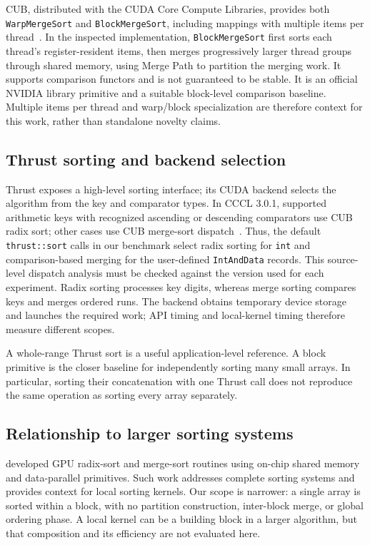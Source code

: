 \documentclass[fleqn,10pt,lineno]{wlpeerj}
\begin{document}
CUB, distributed with the CUDA Core Compute Libraries, provides both \texttt{WarpMergeSort} and \texttt{BlockMergeSort}, including mappings with multiple items per thread~\citep{nvidiaCubWarpMergeSort,nvidiaCubBlockMergeSort}. In the inspected implementation, \texttt{BlockMergeSort} first sorts each thread's register-resident items, then merges progressively larger thread groups through shared memory, using Merge Path to partition the merging work. It supports comparison functors and is not guaranteed to be stable. It is an official NVIDIA library primitive and a suitable block-level comparison baseline. Multiple items per thread and warp/block specialization are therefore context for this work, rather than standalone novelty claims.

\subsection*{Thrust sorting and backend selection}
Thrust exposes a high-level sorting interface; its CUDA backend selects the algorithm from the key and comparator types. In CCCL 3.0.1, supported arithmetic keys with recognized ascending or descending comparators use CUB radix sort; other cases use CUB merge-sort dispatch~\citep{nvidiaThrustSort}. Thus, the default \texttt{thrust::sort} calls in our benchmark select radix sorting for \texttt{int} and comparison-based merging for the user-defined \texttt{IntAndData} records. This source-level dispatch analysis must be checked against the version used for each experiment. Radix sorting processes key digits, whereas merge sorting compares keys and merges ordered runs. The backend obtains temporary device storage and launches the required work; API timing and local-kernel timing therefore measure different scopes.

A whole-range Thrust sort is a useful application-level reference. A block primitive is the closer baseline for independently sorting many small arrays. In particular, sorting their concatenation with one Thrust call does not reproduce the same operation as sorting every array separately.

\subsection*{Relationship to larger sorting systems}
\citet{satish2009designing} developed GPU radix-sort and merge-sort routines using on-chip shared memory and data-parallel primitives. Such work addresses complete sorting systems and provides context for local sorting kernels. Our scope is narrower: a single array is sorted within a block, with no partition construction, inter-block merge, or global ordering phase. A local kernel can be a building block in a larger algorithm, but that composition and its efficiency are not evaluated here.
\end{document}
